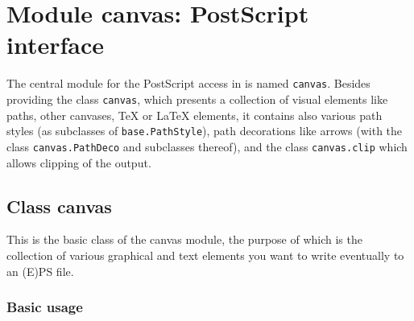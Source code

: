 \chapter{Module canvas: PostScript interface}

\label{canvas}

The central module for the PostScript access in \PyX{} is named
\verb|canvas|. Besides providing the class \verb|canvas|, which
presents a collection of visual elements like paths, other canvases,
\TeX{} or \LaTeX{} elements, it contains also various path styles (as
subclasses of \texttt{base.PathStyle}), path decorations like arrows
(with the class \texttt{canvas.PathDeco} and subclasses thereof), and
the class \texttt{canvas.clip} which allows clipping of the output.


\section{Class canvas}

This is the basic class of the canvas module, the purpose of which is
the collection of various graphical and text elements you want to
write eventually to an (E)PS file. 

\subsection{Basic usage}

